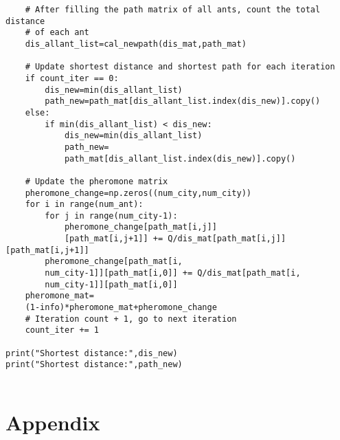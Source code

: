 \documentclass[twocolumn]{article}
\begin{document}
\begin{lstlisting}
	# After filling the path matrix of all ants, count the total distance 	 
	# of each ant
	dis_allant_list=cal_newpath(dis_mat,path_mat)
	
	# Update shortest distance and shortest path for each iteration       
	if count_iter == 0:
		dis_new=min(dis_allant_list)
		path_new=path_mat[dis_allant_list.index(dis_new)].copy()      
	else:
		if min(dis_allant_list) < dis_new:
			dis_new=min(dis_allant_list)
			path_new=
			path_mat[dis_allant_list.index(dis_new)].copy() 
	
	# Update the pheromone matrix
	pheromone_change=np.zeros((num_city,num_city))
	for i in range(num_ant):
		for j in range(num_city-1):
			pheromone_change[path_mat[i,j]]
			[path_mat[i,j+1]] += Q/dis_mat[path_mat[i,j]][path_mat[i,j+1]]
		pheromone_change[path_mat[i,
		num_city-1]][path_mat[i,0]] += Q/dis_mat[path_mat[i,
		num_city-1]][path_mat[i,0]]
	pheromone_mat=
	(1-info)*pheromone_mat+pheromone_change
	# Iteration count + 1, go to next iteration
	count_iter += 1
	
print("Shortest distance:",dis_new)
print("Shortest distance:",path_new)
	
\end{lstlisting}

\section{Appendix}
\end{document}
